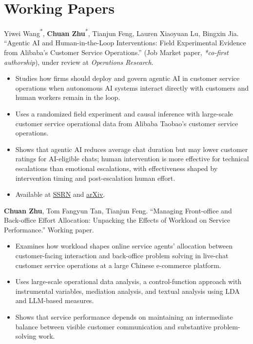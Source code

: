 \section*{Working Papers}

\begin{enumerate}[leftmargin=1.5em, label={[\arabic*]}, itemsep=5pt]
  \item Yiwei Wang\textsuperscript{*}, \textbf{Chuan Zhu}\textsuperscript{*}, Tianjun Feng, Lauren Xiaoyuan Lu, Bingxin Jia. ``Agentic AI and Human-in-the-Loop Interventions: Field Experimental Evidence from Alibaba's Customer Service Operations.'' (Job Market paper, \textit{*co-first authorship}), under review at \textit{Operations Research}.
  \begin{itemize}[leftmargin=1.2em]
    \cvitemsep
    \item Studies how firms should deploy and govern agentic AI in customer service operations when autonomous AI systems interact directly with customers and human workers remain in the loop.
    \item Uses a randomized field experiment and causal inference with large-scale customer service operational data from Alibaba Taobao's customer service operations.
    \item Shows that agentic AI reduces average chat duration but may lower customer ratings for AI-eligible chats; human intervention is more effective for technical escalations than emotional escalations, with effectiveness shaped by intervention timing and post-escalation human effort.
    \item Available at \href{https://papers.ssrn.com/sol3/cf_dev/AbsByAuth.cfm?per_id=11527448}{SSRN} and \href{https://arxiv.org/abs/2605.14830}{arXiv}.
  \end{itemize}

  \item \textbf{Chuan Zhu}, Tom Fangyun Tan, Tianjun Feng. ``Managing Front-office and Back-office Effort Allocation: Unpacking the Effects of Workload on Service Performance.'' Working paper.
  \begin{itemize}[leftmargin=1.2em]
    \cvitemsep
    \item Examines how workload shapes online service agents' allocation between customer-facing interaction and back-office problem solving in live-chat customer service operations at a large Chinese e-commerce platform.
    \item Uses large-scale operational data analysis, a control-function approach with instrumental variables, mediation analysis, and textual analysis using LDA and LLM-based measures.
    \item Shows that service performance depends on maintaining an intermediate balance between visible customer communication and substantive problem-solving work.
  \end{itemize}
\end{enumerate}

